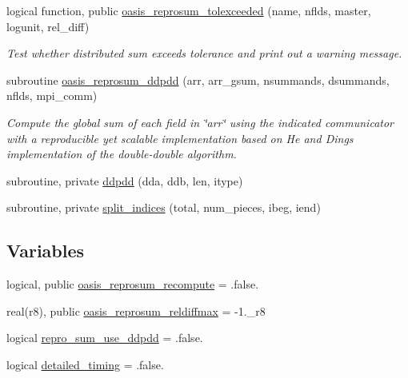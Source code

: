 \begin{DoxyCompactItemize}
logical function, public \hyperlink{namespacemod__oasis__reprosum_a0f773341a7a6883b2f65d395a6b25b08}{oasis\+\_\+reprosum\+\_\+tolexceeded} (name, nflds, master, logunit, rel\+\_\+diff)
\begin{DoxyCompactList}\small\item\em Test whether distributed sum exceeds tolerance and print out a warning message. \end{DoxyCompactList}\item 
subroutine \hyperlink{namespacemod__oasis__reprosum_afe237975bf8e718f32523c3929911102}{oasis\+\_\+reprosum\+\_\+ddpdd} (arr, arr\+\_\+gsum, nsummands, dsummands, nflds, mpi\+\_\+comm)
\begin{DoxyCompactList}\small\item\em Compute the global sum of each field in \char`\"{}arr\char`\"{} using the indicated communicator with a reproducible yet scalable implementation based on He and Ding\textquotesingle{}s implementation of the double-\/double algorithm. \end{DoxyCompactList}\item 
subroutine, private \hyperlink{namespacemod__oasis__reprosum_a24f9efa3ca739811888206eaf71d4690}{ddpdd} (dda, ddb, len, itype)
\item 
subroutine, private \hyperlink{namespacemod__oasis__reprosum_affb09b4ec9b001bf2ebbc51feebd8004}{split\+\_\+indices} (total, num\+\_\+pieces, ibeg, iend)
\end{DoxyCompactItemize}
\subsection*{Variables}
\begin{DoxyCompactItemize}
\item 
logical, public \hyperlink{namespacemod__oasis__reprosum_a89140c250e34a903bc9aa546574988d6}{oasis\+\_\+reprosum\+\_\+recompute} = .false.
\item 
real(r8), public \hyperlink{namespacemod__oasis__reprosum_a6a80f4226d35d0842617e6eb6c9406e1}{oasis\+\_\+reprosum\+\_\+reldiffmax} = -\/1.\+\_\+r8
\item 
logical \hyperlink{namespacemod__oasis__reprosum_aab06d0de9a82726d347ac52bb276355d}{repro\+\_\+sum\+\_\+use\+\_\+ddpdd} = .false.
\item 
logical \hyperlink{namespacemod__oasis__reprosum_a48a084c213295b9eaa78c0552a10741a}{detailed\+\_\+timing} = .false.
\end{DoxyCompactItemize}


